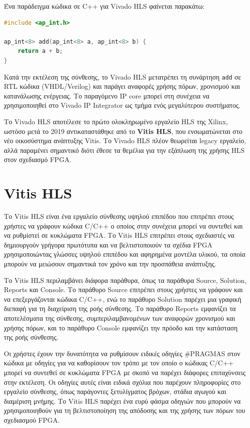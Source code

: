 Ένα παράδειγμα κώδικα σε C++ για Vivado HLS φαίνεται παρακάτω:

\begin{lstlisting}[language=C++, caption={Παράδειγμα απλού αθροιστή σε Vivado HLS}]
#include <ap_int.h>

ap_int<8> add(ap_int<8> a, ap_int<8> b) {
    return a + b;
}
\end{lstlisting}

Κατά την εκτέλεση της σύνθεσης, το Vivado HLS μετατρέπει τη συνάρτηση \texttt{add} σε RTL κώδικα (VHDL/Verilog) και
παράγει αναφορές χρήσης πόρων, χρονισμού και κατανάλωσης ενέργειας. Το παραγόμενο IP core μπορεί στη συνέχεια να χρησιμοποιηθεί στο Vivado IP Integrator ως τμήμα ενός μεγαλύτερου συστήματος.

Το Vivado HLS αποτέλεσε το πρώτο ολοκληρωμένο εργαλείο HLS της Xilinx, ωστόσο μετά το 2019 αντικαταστάθηκε από το \textbf{Vitis HLS},
που ενσωματώνεται στο νέο οικοσύστημα ανάπτυξης Vitis. Το Vivado HLS πλέον θεωρείται legacy εργαλείο, αλλά παραμένει σημαντικό διότι έθεσε τα θεμέλια για την εξάπλωση της χρήσης HLS στον σχεδιασμό FPGA.

\section{Vitis HLS}

Το Vitis HLS είναι ένα εργαλείο σύνθεσης υψηλού επιπέδου που επιτρέπει στους χρήστες να γράφουν κώδικα C/C++ ο οποίος στην συνέχεια
μπορεί να συντεθεί και να ρυθμίστεί σε κυκλώματα FPGA. Το Vitis HLS επιτρέπει στους σχεδιαστές να δημιουργούν γρήγορα πρωτότυπα και να βελτιστοποιούν
τα σχέδια FPGA χρησιμοποιώντας γλώσσες υψηλού επιπέδου και αφηρημένα μοντέλα υλικού, τα οποία μπορούν να μειώσουν σημαντικά τον χρόνο και την προσπάθεια ανάπτυξης.

Το Vitis HLS περιλαμβάνει διάφορα παράθυρα, όπως τα παράθυρα Source, Solution, Reports και Console.
Το παράθυρο Source επιτρέπει στους χρήστες να γράφουν και να επεξεργάζονται κώδικα C/C++, ενώ το παράθυρο Solution παρέχει μια
γραφική διεπαφή για τη διαχείριση της ροής σύνθεσης. Το παράθυρο Reports εμφανίζει τα αποτελέσματα της σύνθεσης, συμπεριλαμβανομένων
των αναφορών χρονισμού και χρήσης πόρων, και το παράθυρο Console εμφανίζει την πρόοδο και την κατάσταση της ροής σύνθεσης.

Οι χρήστες έχουν την δυνατότητα να ρυθμίσουν ειδικές οδηγίες \#PRAGMAS στον κώδικα με οδηγίες για να καθορίσουν τον τρόπο με τον οποίο ο κώδικας C/C++ μπορεί να συντεθεί σε κυκλώματα FPGA
με σκοπό να παρέχει διάφορες επιταχύνσεις στην εκτέλεση. Οι οδηγίες αυτές είναι ειδικά σχόλια που παρέχουν πληροφορίες στο εργαλείο σύνθεσης, όπως παράγοντες ξετυλίγματος βρόχων,
στάδια αγωγού και διαμέριση μνήμης.
Το Vitis HLS παρέχει ένα ευρύ φάσμα οδηγιών που μπορούν να χρησιμοποιηθούν για τη βελτιστοποίηση της απόδοσης και της χρήσης των πόρων του σχεδιασμού FPGA.


